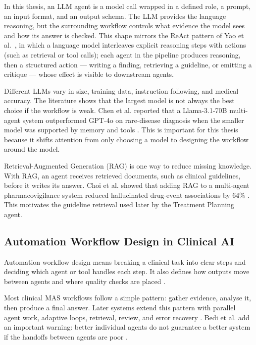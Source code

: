In this thesis, an LLM agent is a model call wrapped in a defined role, a prompt,
an input format, and an output schema. The LLM provides the language reasoning,
but the surrounding workflow controls what evidence the model sees and how its
answer is checked. This shape mirrors the ReAct
pattern of Yao et al.~\cite{Yao2023ReAct}, in which a language model
interleaves explicit reasoning steps with actions (such as retrieval
or tool calls); each agent in the pipeline produces reasoning, then a
structured action --- writing a finding, retrieving a guideline, or
emitting a critique --- whose effect is visible to downstream agents.

Different LLMs vary in size, training data, instruction following, and medical
accuracy. The literature shows that the largest model is not always the best
choice if the workflow is weak. Chen et al. reported that a Llama-3.1-70B
multi-agent system outperformed GPT-4o on rare-disease diagnosis when the smaller
model was supported by memory and tools \cite{Chen2024RareAgents}. This is
important for this thesis because it shifts attention from only choosing a model
to designing the workflow around the model.

Retrieval-Augmented Generation (RAG) is one way to reduce missing knowledge. With
RAG, an agent receives retrieved documents, such as clinical guidelines, before
it writes its answer. Choi et al. showed that adding RAG to a multi-agent
pharmacovigilance system reduced hallucinated drug-event associations by 64\%
\cite{Choi2024MALADE}. This motivates the guideline retrieval used later by the
Treatment Planning agent.

\FloatBarrier
\subsection{Automation Workflow Design in Clinical AI}
\label{subsec:workflow_design}

Automation workflow design means breaking a clinical task into clear steps and
deciding which agent or tool handles each step. It also defines how outputs move
between agents and where quality checks are placed \cite{Barra2025Agentic}.

Most clinical MAS workflows follow a simple pattern: gather evidence, analyse it,
then produce a final answer. Later systems extend this pattern with parallel
agent work, adaptive loops, retrieval, review, and error recovery
\cite{Tang2024MedAgents,Barra2025Agentic,Lu2024TriageAgent,Wu2024EHRFlow}.
Bedi et al. add an important warning: better individual agents do not guarantee a
better system if the handoffs between agents are poor \cite{Bedi2025OptParadox}.


